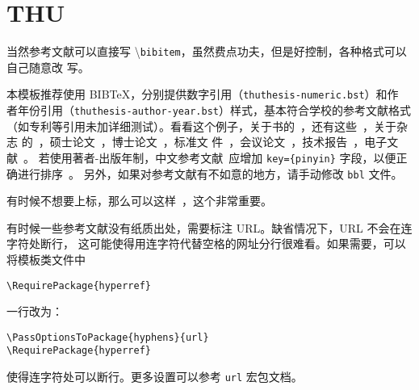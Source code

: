 \documentclass[twoside]{article}
\def\cs#1{\textbackslash\texttt{#1}}
\begin{document}
    \section*{THU}

\nocite{thuthesis}

当然参考文献可以直接写 \cs{bibitem}，虽然费点功夫，但是好控制，各种格式可以自己随意改
写。

本模板推荐使用 BIB\TeX，分别提供数字引用（\texttt{thuthesis-numeric.bst}）和作
者年份引用（\texttt{thuthesis-author-year.bst}）样式，基本符合学校的参考文献格式
（如专利等引用未加详细测试）。看看这个例子，关于书的~\cite{tex, companion,
  ColdSources}，还有这些~\cite{Krasnogor2004e, clzs, zjsw}，关于杂志
的~\cite{ELIDRISSI94, MELLINGER96, SHELL02}，硕士论文~\cite{zhubajie,
  metamori2004}，博士论文~\cite{shaheshang, FistSystem01}，标准文
件~\cite{IEEE-1363}，会议论文~\cite{DPMG,kocher99}，技术报告~\cite{NPB2}，电子文
献~\cite{chuban2001,oclc2000}。
若使用著者-出版年制，中文参考文献~\cite{cnarticle}应增加
\texttt{key=\{pinyin\}} 字段，以便正确进行排序~\cite{cnproceed}。
另外，如果对参考文献有不如意的地方，请手动修改 \texttt{bbl} 文件。

有时候不想要上标，那么可以这样~\parencite{shaheshang}，这个非常重要。

有时候一些参考文献没有纸质出处，需要标注 URL。缺省情况下，URL 不会在连字符处断行，
这可能使得用连字符代替空格的网址分行很难看。如果需要，可以将模板类文件中
\begin{verbatim}
\RequirePackage{hyperref}
\end{verbatim}
一行改为：
\begin{verbatim}
\PassOptionsToPackage{hyphens}{url}
\RequirePackage{hyperref}
\end{verbatim}
使得连字符处可以断行。更多设置可以参考 \texttt{url} 宏包文档。

    \printbibliography

    
\end{document}
